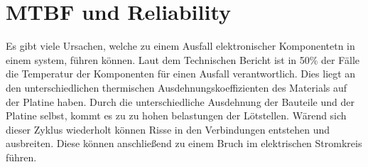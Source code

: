 \section{MTBF und Reliability}
Es gibt viele Ursachen, welche zu einem Ausfall elektronischer Komponentetn in einem system, führen können. Laut dem Technischen Bericht \cite{AIP} ist in 50\% der Fälle die Temperatur der Komponenten für einen Ausfall verantwortlich. Dies liegt an den unterschiedlichen thermischen Ausdehnungskoeffizienten des Materials auf der Platine haben. Durch die unterschiedliche Ausdehnung der Bauteile und der Platine selbst, kommt es zu zu hohen belastungen der Lötstellen. Wärend sich dieser Zyklus wiederholt  können Risse in den Verbindungen entstehen und ausbreiten. Diese können anschließend zu einem Bruch im elektrischen Stromkreis führen.\\

